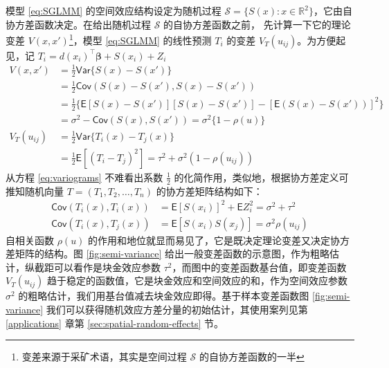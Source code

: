 \documentclass[12pt,a4paper,UTF8,twoside]{book}
\theoremstyle{definition}
\theoremstyle{definition}
\theoremstyle{definition}
\theoremstyle{remark}
\begin{document}
模型 \eqref{eq:SGLMM} 的空间效应结构设定为随机过程
\(\mathcal{S} = \{S(x): x \in \mathbb{R}^2\}\)，它由自协方差函数决定。在给出随机过程
\(\mathcal{S}\) 的自协方差函数之前， 先计算一下它的理论变差
\(V(x,x')\)\footnote{变差来源于采矿术语，其实是空间过程 \(\mathcal{S}\)
  的自协方差函数的一半}，模型 \eqref{eq:SGLMM} 的线性预测 \(T_{i}\) 的变差
\(V_{T}(u_{ij})\)。为方便起见，记
\(T_{i} = d(x_i)^{\top}\boldsymbol{\beta} + S(x_i) + Z_i\)
\begin{equation}
\begin{aligned}
V(x,x') 
      &= \frac{1}{2}\mathsf{Var}\{S(x)-S(x')\}\\
      &= \frac{1}{2}\mathsf{Cov}(S(x)-S(x'),S(x)-S(x'))\\
      &= \frac{1}{2}\{\mathsf{E}[S(x)-S(x')][S(x)-S(x')]-[\mathsf{E}(S(x)-S(x'))]^2\}\\
      &= \sigma^2-\mathsf{Cov}(S(x),S(x'))=\sigma^2\{1-\rho(u)\}\\
V_{T}(u_{ij})
      &= \frac{1}{2}\mathsf{Var}\{T_{i}(x)-T_{j}(x)\} \\
      &= \frac{1}{2}\mathsf{E}[(T_{i}-T_{j})^2]=\tau^2+\sigma^2(1-\rho(u_{ij})) 
\end{aligned} \label{eq:variograms}
\end{equation} \noindent 从方程 \eqref{eq:variograms} 不难看出系数
\(\frac{1}{2}\) 的化简作用，类似地，根据协方差定义可推知随机向量
\(T = (T_1,T_2,\ldots,T_n)\) 的协方差矩阵结构如下： \begin{equation}
\begin{aligned}
\mathsf{Cov}(T_{i}(x),T_{i}(x)) &= \mathsf{E}[S(x_i)]^2 + \mathsf{E}Z_{i}^{2}= \sigma^2+\tau^2 \\
\mathsf{Cov}(T_{i}(x),T_{j}(x)) &= \mathsf{E}[S(x_i)S(x_j)]  = \sigma^2\rho(u_{ij})
\end{aligned}
\end{equation} \noindent 自相关函数 \(\rho(u)\)
的作用和地位就显而易见了，它是既决定理论变差又决定协方差矩阵的结构。图
\ref{fig:semi-variance}
给出一般变差函数的示意图，作为粗略估计，纵截距可以看作是块金效应参数
\(\tau^2\)，而图中的变差函数基台值，即变差函数 \(V_{T}(u_{ij})\)
趋于稳定的函数值，它是块金效应和空间效应的和，作为空间效应参数
\(\sigma^2\)
的粗略估计，我们用基台值减去块金效应即得。基于样本变差函数图
\ref{fig:semi-variance}
我们可以获得随机效应方差分量的初始估计，其使用案列见第
\ref{applications} 章第 \ref{sec:spatial-random-effects} 节。
\end{document}
